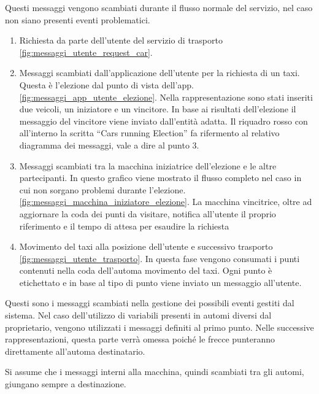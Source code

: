 Questi messaggi vengono scambiati durante il flusso normale del servizio, nel caso non siano presenti eventi problematici.
\begin{enumerate}	
	\item Richiesta da parte dell'utente del servizio di trasporto \ref{fig:messaggi_utente_request_car}.
	\item Messaggi scambiati dall'applicazione dell'utente per la richiesta di un taxi. Questa è l'elezione dal punto di vista dell'app. \ref{fig:messaggi_app_utente_elezione}. Nella rappresentazione sono stati inseriti due veicoli, un iniziatore e un vincitore. In base ai risultati dell'elezione il messaggio del vincitore viene inviato dall'entità adatta. Il riquadro rosso con all'interno la scritta ``Cars running Election'' fa rifermento al relativo diagramma dei messaggi, vale a dire al punto 3.
	\item Messaggi scambiati tra la macchina iniziatrice dell'elezione e le altre partecipanti. In questo grafico viene mostrato il flusso completo nel caso in cui non sorgano problemi durante l'elezione. \ref{fig:messaggi_macchina_iniziatore_elezione}. La macchina vincitrice, oltre ad aggiornare la coda dei punti da visitare, notifica all'utente il proprio riferimento e il tempo di attesa per esaudire la richiesta
	\item Movimento del taxi alla posizione dell'utente e successivo trasporto \ref{fig:messaggi_utente_trasporto}. In questa fase vengono consumati i punti contenuti nella coda dell'automa movimento del taxi. Ogni punto è etichettato e in base al tipo di punto viene inviato un messaggio all'utente.
\end{enumerate}

Questi sono i messaggi scambiati nella gestione dei possibili eventi gestiti dal sistema. Nel caso dell'utilizzo di variabili presenti in automi diversi dal proprietario, vengono utilizzati i messaggi definiti al primo punto. Nelle successive rappresentazioni, questa parte verrà omessa poiché le frecce punteranno direttamente all'automa destinatario.

Si assume che i messaggi interni alla macchina, quindi scambiati tra gli automi, giungano sempre a destinazione.

